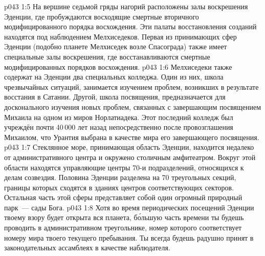 \vs p043 1:5 \pc На вершине седьмой гряды нагорий расположены залы воскрешения Эденции, где пробуждаются восходящие смертные вторичного модифицированного порядка восхождения. Эти палаты восстановления созданий находятся под наблюдением Мелхиседеков. Первая из принимающих сфер Эденции (подобно планете Мелхиседек возле Спасограда) также имеет специальные залы воскрешения, где восстанавливаются смертные модифицированных порядков восхождения.
\vs p043 1:6 Мелхиседеки также содержат на Эденции два специальных колледжа. Один из них, школа чрезвычайных ситуаций, занимается изучением проблем, возникших в результате восстания в Сатании. Другой, школа посвящения, предназначается для досконального изучения новых проблем, связанных с завершающим посвящением Михаила на одном из миров Норлатиадека. Этот последний колледж был учреждён почти 40\,000 лет назад непосредственно после провозглашения Михаилом, что Урантия выбрана в качестве мира его завершающего посвящения.
\vs p043 1:7 \pc Стеклянное море, принимающая область Эденции, находится недалеко от административного центра и окружено столичным амфитеатром. Вокруг этой области находятся управляющие центры 70-и подразделений, относящихся к делам созвездия. Половина Эденции разделена на 70 треугольных секций, границы которых сходятся в зданиях центров соответствующих секторов. Остальная часть этой сферы представляет собой один огромный природный парк~--- сады Бога.
\vs p043 1:8 Хотя во время периодических посещений Эденции твоему взору будет открыта вся планета, б\'ольшую часть времени ты будешь проводить в административном треугольнике, номер которого соответствует номеру мира твоего текущего пребывания. Ты всегда будешь радушно принят в законодательных ассамблеях в качестве наблюдателя.
